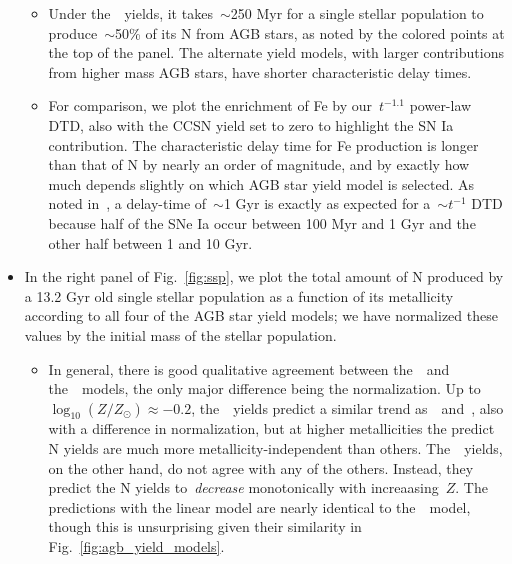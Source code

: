 \documentclass[ms.tex]{subfiles}
\begin{document}
\begin{itemize}
\begin{itemize}
		\item Under the~\cristallo~yields, it takes~$\sim$250 Myr for a single 
		stellar population to produce~$\sim$50\% of its N from AGB stars, as 
		noted by the colored points at the top of the panel. 
		The alternate yield models, with larger contributions from higher mass 
		AGB stars, have shorter characteristic delay times. 

		\item For comparison, we plot the enrichment of Fe by our~$t^{-1.1}$ 
		power-law DTD, also with the CCSN yield set to zero to highlight the 
		SN Ia contribution. 
		The characteristic delay time for Fe production is longer than that of 
		N by nearly an order of magnitude, and by exactly how much depends 
		slightly on which AGB star yield model is selected. 
		As noted in~\citet{Johnson2021}, a delay-time of~$\sim$1 Gyr is exactly 
		as expected for a~$\sim t^{-1}$ DTD because half of the SNe Ia occur 
		between 100 Myr and 1 Gyr and the other half between 1 and 10 Gyr. 
	\end{itemize} 

	\item In the right panel of Fig.~\ref{fig:ssp}, we plot the total amount of 
	N produced by a 13.2 Gyr old single stellar population as a function of 
	its metallicity according to all four of the AGB star yield models; we have 
	normalized these values by the initial mass of the stellar population. 
	\begin{itemize} 
		\item In general, there is good qualitative agreement between 
		the~\cristallo~and the~\ventura~models, the only major difference being 
		the normalization. 
		Up to~$\log_{10}(Z/Z_\odot) \approx -0.2$, the~\karakas~yields predict 
		a similar trend as~\cristallo~and~\ventura, also with a difference in 
		normalization, but at higher metallicities the predict N yields are 
		much more metallicity-independent than others. 
		The~\karakasten~yields, on the other hand, do not agree with any of the 
		others. 
		Instead, they predict the N yields to~\textit{decrease} monotonically 
		with increaasing~$Z$. 
		The predictions with the linear model are nearly identical to 
		the~\cristallo~model, though this is unsurprising given their 
		similarity in Fig.~\ref{fig:agb_yield_models}. 
	\end{itemize} 
\end{itemize} 
\end{document}
